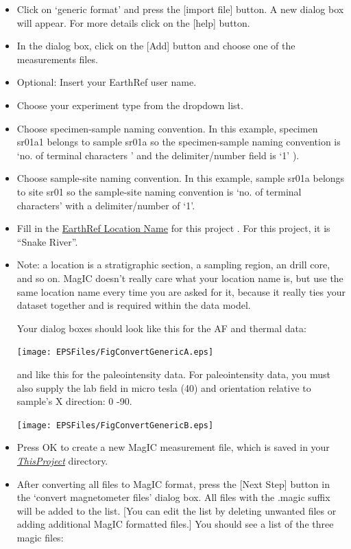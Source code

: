 \documentclass[11pt]{book}
\begin{document}
{{\begin{itemize}
\item  Click on  `generic format'  and press the  [import file] button.  A new dialog box will appear. For more details click on the [help] button.
\item  In the dialog box, click on the [Add] button and choose one of the measurements files.
\item  Optional: Insert your EarthRef user name.
\item Choose your experiment type from the dropdown list.

\item Choose specimen-sample naming convention.  In this example, specimen sr01a1 belongs to sample sr01a so the specimen-sample naming convention is  `no. of terminal characters ' and the delimiter/number field is `1' ).
\item Choose sample-site naming convention.  In this example, sample sr01a belongs to site sr01 so the sample-site naming convention is  `no. of terminal characters' with a delimiter/number of  `1'.
\item  Fill in the \href{#MagICDatabase}{EarthRef Location Name}  for this project .  For this project, it is ``Snake River''.

\item Note:  a location is a stratigraphic section,  a sampling region,  an drill core, and so on.  MagIC doesn't really care what your location name is, but use the same location name every time you are asked for it, because it really ties your dataset together and is required within the data model.

Your dialog boxes should look like this for the AF and thermal data:

\texttt{[image: EPSFiles/FigConvertGenericA.eps]}

and like this for the  paleointensity data.  For paleointensity data, you must also supply the lab field in micro tesla (40) and orientation relative to sample's X direction:  0 -90.

\texttt{[image: EPSFiles/FigConvertGenericB.eps]}

\item Press OK to create a new MagIC measurement file, which is saved in your \href{#Project_Directory}{\it ThisProject} directory.



\item After converting all files to MagIC format, press the [Next Step] button in the `convert magnetometer files' dialog box. All files with the .magic suffix will be added to the list.  [You can edit the list by deleting unwanted files or adding additional MagIC formatted files.]   You should see a list of the three magic files:


\end{itemize}}}
\end{document}
